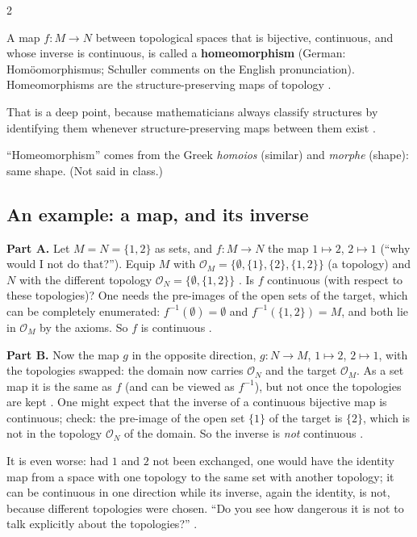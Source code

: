 \begin{paracol}{2}
\begin{definition}\label{def:c01-homeo}
A map $f\colon M\to N$ between topological spaces that is bijective, continuous, and whose inverse is continuous, is called a
\textbf{homeomorphism} (German: Hom\"oomorphismus; Schuller comments on the English pronunciation).
Homeomorphisms are the structure-preserving maps of topology .
\end{definition}
That is a deep point, because mathematicians always classify structures by identifying them whenever structure-preserving maps
between them exist .

\begin{coursenote}[Name]
``Homeomorphism'' comes from the Greek \emph{homoios} (similar) and \emph{morphe} (shape): same shape. (Not said in class.)
\end{coursenote}

\subsection{An example: a map, and its inverse}

\begin{example}\label{ex:c01-f-g}
\textbf{Part A.} Let $M=N=\{1,2\}$ as sets, and $f\colon M\to N$ the map $1\mapsto2$, $2\mapsto1$ (``why would I not do that?'').
Equip $M$ with $\mathcal O_M=\{\emptyset,\{1\},\{2\},\{1,2\}\}$ (a topology) and $N$ with the different topology
$\mathcal O_N=\{\emptyset,\{1,2\}\}$ . Is $f$ continuous (with respect to these
topologies)? One needs the pre-images of the open sets of the target, which can be completely enumerated: $f^{-1}(\emptyset)=\emptyset$ and
$f^{-1}(\{1,2\})=M$, and both lie in $\mathcal O_M$ by the axioms. So $f$ is continuous .

\textbf{Part B.} Now the map $g$ in the opposite direction, $g\colon N\to M$, $1\mapsto2$, $2\mapsto1$, with the topologies swapped: the domain
now carries $\mathcal O_N$ and the target $\mathcal O_M$. As a set map it is the same as $f$ (and can be viewed as $f^{-1}$), but not once the topologies
are kept . One might expect that the inverse of a continuous bijective map is
continuous; check: the pre-image of the open set $\{1\}$ of the target is $\{2\}$, which is not in the topology $\mathcal O_N$ of the domain. So the
inverse is \emph{not} continuous .
\end{example}
It is even worse: had $1$ and $2$ not been exchanged, one would have the identity map from a space with one topology to the same set with another topology;
it can be continuous in one direction while its inverse, again the identity, is not, because different topologies were chosen. ``Do you see how
dangerous it is not to talk explicitly about the topologies?'' .


\end{paracol}
